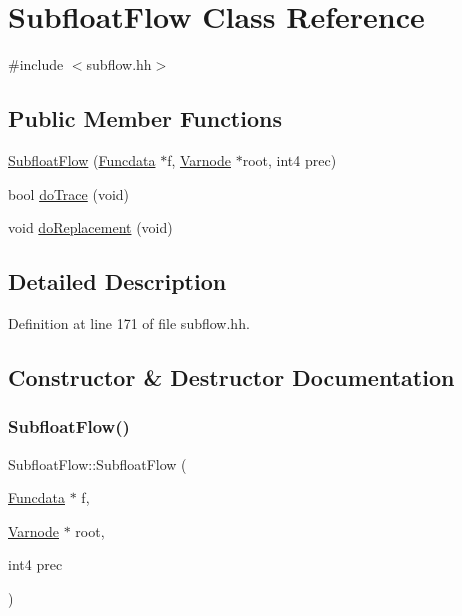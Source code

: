 \hypertarget{class_subfloat_flow}{}\section{Subfloat\+Flow Class Reference}
\label{class_subfloat_flow}


{\ttfamily \#include $<$subflow.\+hh$>$}

\subsection*{Public Member Functions}
\begin{DoxyCompactItemize}
\item 
\mbox{\hyperlink{class_subfloat_flow_a513a571ec4845bd6753dff960f6fafbf}{Subfloat\+Flow}} (\mbox{\hyperlink{class_funcdata}{Funcdata}} $\ast$f, \mbox{\hyperlink{class_varnode}{Varnode}} $\ast$root, int4 prec)
\item 
bool \mbox{\hyperlink{class_subfloat_flow_a3dcd19f6211a8050c6a24759b1c90bd5}{do\+Trace}} (void)
\item 
void \mbox{\hyperlink{class_subfloat_flow_ad9a5a1b26c82e8855d9eba6dcca0719c}{do\+Replacement}} (void)
\end{DoxyCompactItemize}


\subsection{Detailed Description}


Definition at line 171 of file subflow.\+hh.



\subsection{Constructor \& Destructor Documentation}
\mbox{\label{class_subfloat_flow_a513a571ec4845bd6753dff960f6fafbf}} 
\subsubsection{\texorpdfstring{SubfloatFlow()}{SubfloatFlow()}}
{\footnotesize\ttfamily Subfloat\+Flow\+::\+Subfloat\+Flow (\begin{DoxyParamCaption}\item[{\mbox{\hyperlink{class_funcdata}{Funcdata}} $\ast$}]{f,  }\item[{\mbox{\hyperlink{class_varnode}{Varnode}} $\ast$}]{root,  }\item[{int4}]{prec }\end{DoxyParamCaption})}



